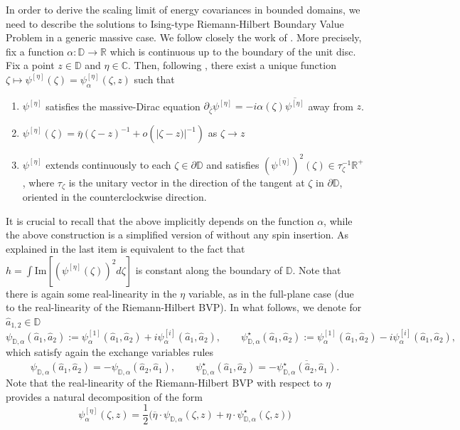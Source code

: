 \documentclass[reqno]{amsart}
\numberwithin{equation}{section}
\theoremstyle{definition}
\theoremstyle{remark}
\begin{document}
In order to derive the scaling limit of energy covariances in bounded domains, we need to describe the solutions to Ising-type Riemann-Hilbert Boundary Value Problem in a generic massive case. We follow closely the work of \cite[Section 6]{park2025near}. More precisely, fix a function $\alpha :\mathbb{D} \to \mathbb{R} $ which is continuous up to the boundary of the unit disc. Fix a point $z\in \mathbb{D}$ and $\eta \in \mathbb{C}$. Then, following \cite[Definition 6.4]{park2025near}, there exist a unique function $\zeta \mapsto \psi^{[\eta]}(\zeta)= \psi^{[\eta]}_{\alpha}(\zeta,z)$ such that
\begin{enumerate}
	\item $\psi^{[\eta]}$ satisfies the massive-Dirac equation $\partial_{\bar{\zeta}} \psi^{[\eta]} = -i\alpha(\zeta) \overline{\psi^{[\eta]}} $ away from $z$.
	\item $\psi^{[\eta]}(\zeta) = \bar{\eta} (\zeta-z)^{-1} + o(|\zeta-z)|^{-1})$ as $\zeta \to z$
	\item $ \psi^{[\eta]}$ extends continuously to each $\zeta \in \partial \mathbb{D}$ and satisfies $ (\psi^{[\eta]})^2(\zeta) \in \tau_{\zeta}^{-1}\mathbb{R}^+$, where $\tau_{\zeta}$ is the unitary vector in the direction of the tangent at $\zeta $ in $\partial \mathbb{D}$, oriented in the counterclockwise direction.
\end{enumerate}
It is crucial to recall that the above implicitly depends on the function $\alpha$, while the above construction is a simplified version of \cite[Definition 6.4]{park2025near} without any spin insertion. As explained in \cite[Remark 6.12]{park2025near} the last item is equivalent to the fact that $h=\int\textrm{Im}[(\psi^{[\eta]}(\zeta))^2d\zeta]$ is constant along the boundary of $\mathbb{D}$. Note that there is again some real-linearity in the $\eta$ variable, as in the full-plane case (due to the real-linearity of the Riemann-Hilbert BVP). In what follows, we denote for $\hat{a}_{1,2} \in \mathbb{D} $
\begin{equation*}
	\psi_{\mathbb{D},\alpha}(\hat{a}_1,\hat{a}_2):= \psi^{[1]}_{\alpha}(\hat{a}_1,\hat{a}_2) + i \psi^{[i]}_{\alpha}(\hat{a}_1,\hat{a}_2), \qquad \psi^\star_{\mathbb{D},\alpha}(\hat{a}_1,\hat{a}_2):= \psi^{[1]}_{\alpha}(\hat{a}_1,\hat{a}_2) -i \psi^{[i]}_{\alpha}(\hat{a}_1,\hat{a}_2),
\end{equation*}
which satisfy again the exchange variables rules
\begin{equation} 
    \psi_{\mathbb{D},\alpha}(\hat{a}_1,\hat{a}_2)=-\psi_{\mathbb{D},\alpha}(\hat{a}_2,\hat{a}_1),
    \qquad \psi^\star_{\mathbb{D},\alpha}(\hat{a}_1,\hat{a}_2) =-
    \overline{\psi^\star_{\mathbb{D},\alpha}(\hat{a}_2,\hat{a}_1)}.
\end{equation}
Note that the real-linearity of the Riemann-Hilbert BVP with respect to $\eta$ provides a natural decomposition of the form
\begin{equation*}
\psi^{[\eta]}_{\alpha}(\zeta,z) = \frac{1}{2} \Big( \overline{\eta} \cdot \psi_{\mathbb{D},\alpha}(\zeta,z) + \eta \cdot \psi^\star_{\mathbb{D},\alpha}(\zeta,z) \Big)
\end{equation*}
\end{document}
